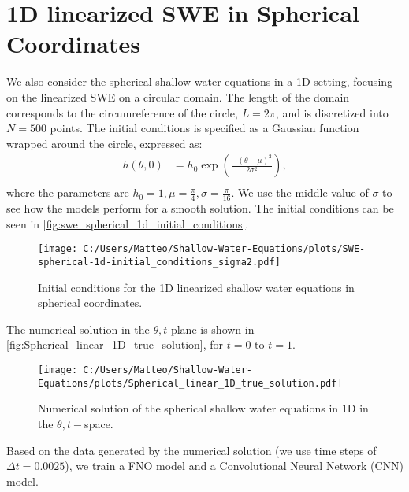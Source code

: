 \section{1D linearized SWE in Spherical Coordinates}
We also consider the spherical shallow water equations in a 1D setting, focusing on the linearized SWE on a circular domain.
The length of the domain corresponds to the circumreference of the circle, $L = 2\pi$, and is discretized into $N = 500$ points.
The initial conditions is specified as a Gaussian function wrapped around the circle, expressed as:
\begin{align*}
    h(\theta, 0) &= h_0 \exp \left( \frac{-{(\theta-\mu)}^2}{2 \sigma^2} \right) ,\\
\end{align*}
where the parameters are $h_0 = 1, \mu = \frac{\pi}{4}, \sigma = \frac{\pi}{16}$.
We use the middle value of $\sigma$ to see how the models perform for a smooth solution.
The initial conditions can be seen in \autoref{fig:swe_spherical_1d_initial_conditions}.
\begin{figure}[H]
    \centering
    \texttt{[image: C:/Users/Matteo/Shallow-Water-Equations/plots/SWE-spherical-1d-initial\_conditions\_sigma2.pdf]}
    \caption{Initial conditions for the 1D linearized shallow water equations in spherical coordinates.}\label{fig:swe_spherical_1d_initial_conditions}
\end{figure}


The numerical solution in the $\theta,t$ plane is shown in \autoref{fig:Spherical_linear_1D_true_solution}, for $t=0$ to $t=1$.
\begin{figure}[H]
    \centering
    \texttt{[image: C:/Users/Matteo/Shallow-Water-Equations/plots/Spherical\_linear\_1D\_true\_solution.pdf]}
    \caption{Numerical solution of the spherical shallow water equations in 1D in the $\theta,t-$space.}\label{fig:Spherical_linear_1D_true_solution}
\end{figure}
Based on the data generated by the numerical solution (we use time steps of $\Delta t = 0.0025$), we train a FNO model and a Convolutional Neural Network (CNN) model.


